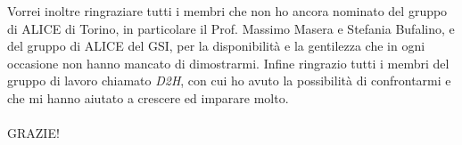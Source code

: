 \documentclass[b5paper,10pt,twoside,oldstyle,classica]{toptesi}
\begin{document}
Vorrei inoltre ringraziare tutti i membri che non ho ancora nominato del gruppo di ALICE di Torino, in particolare il Prof. Massimo Masera e Stefania Bufalino, e del gruppo di ALICE del GSI, per la disponibilit\`{a} e la gentilezza che in ogni occasione non hanno mancato di dimostrarmi. Infine ringrazio tutti i membri del gruppo di lavoro chiamato \textit{D2H}, con cui ho avuto la possibilit\`{a} di confrontarmi e che mi hanno aiutato a crescere ed imparare molto.\\\\
GRAZIE!
\end{document}

